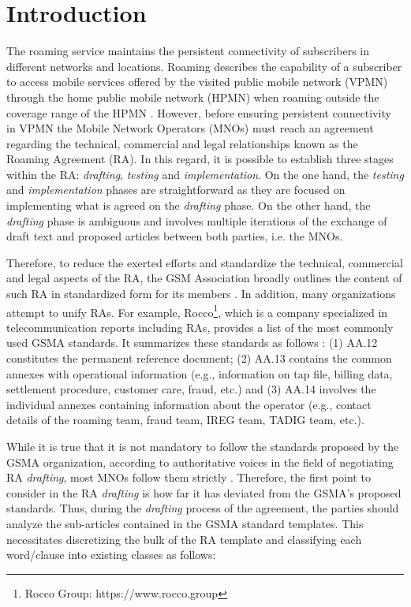 \section{Introduction}\label{intro}
The roaming service maintains the persistent connectivity of subscribers in different networks and locations. Roaming describes the capability of a subscriber to access mobile services offered by the visited public mobile network (VPMN) through the home public mobile network (HPMN) when roaming outside the coverage range of the HPMN \cite{Tanaka2013}. However, before ensuring persistent connectivity in VPMN the Mobile Network Operators (MNOs) must reach an agreement regarding the technical, commercial and legal relationships known as the Roaming Agreement (RA). In this regard, it is possible to establish three stages within the RA: \textit{drafting}, \textit{testing} and \textit{implementation}. On the one hand, the \textit{testing} and \textit{implementation} phases are straightforward as they are focused on implementing what is agreed on the \textit{drafting} phase. On the other hand, the \textit{drafting} phase is ambiguous and involves multiple iterations of the exchange of draft text and proposed articles between both parties, i.e. the MNOs.

Therefore, to reduce the exerted efforts and standardize the technical, commercial and legal aspects of the RA, the GSM Association broadly outlines the content of such RA in standardized form for its members \cite{Ferwerda2018}. 
In addition, many organizations attempt to unify RAs. For example, Rocco\footnote{Rocco Group: https://www.rocco.group}, which is a company specialized in telecommunication reports including RAs, provides a list of the most commonly used GSMA standards. It summarizes these standards as follows \cite{ROCCO2017}: (1) AA.12 constitutes the permanent reference document; (2) AA.13 contains the common annexes with operational information (e.g., information on tap file, billing data, settlement procedure, customer care, fraud, etc.) and (3) AA.14 involves the individual annexes containing information about the operator (e.g., contact details of the roaming team, fraud team, IREG team, TADIG team, etc.).

While it is true that it is not mandatory to follow the standards proposed by the GSMA organization, according to authoritative voices in the field of negotiating RA \textit{drafting}, most MNOs follow them strictly \cite{ROCCO2017a}. Therefore, the first point to consider in the RA \textit{drafting} is how far it has deviated from the GSMA's proposed standards. Thus, during the \textit{drafting} process of the agreement, the parties should analyze the sub-articles contained in the GSMA standard templates. This necessitates discretizing the bulk of the RA template and classifying each word/clause into existing classes as follows:

